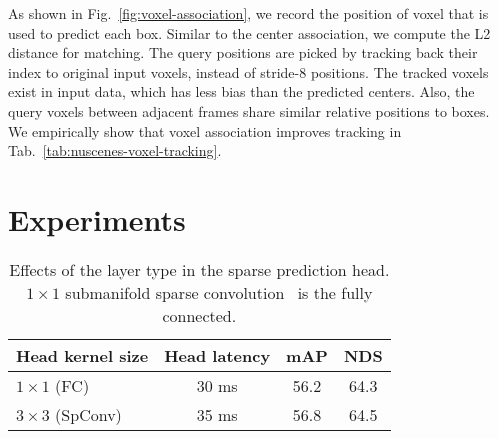 \documentclass[10pt,twocolumn,letterpaper]{article}
\begin{document}
As shown in Fig.~\ref{fig:voxel-association}, we record the position of voxel that is used to predict each box. Similar to the center association, we compute the L2 distance for matching. The query positions are picked by tracking back their index to original input voxels, instead of stride-8 positions.  The tracked voxels exist in input data, which has less bias than the predicted centers. Also, the query voxels between adjacent frames share similar relative positions to boxes. We empirically show that voxel association improves tracking in Tab.~\ref{tab:nuscenes-voxel-tracking}.

\section{Experiments}
\label{sec:experiments}

\begin{table}[t]
\begin{center}
\caption{Ablations on 2D or 3D sparse CNN in VoxelNeXt. sparse height Compression is used to connect 3D backbone and 2D head.}
\label{tab:ablation-sparse-bev-compression}
\end{center}
\end{table}
\begin{table}[t]
\begin{center}
\caption{Effects of the layer type in the sparse prediction head. $1\times 1$ submanifold sparse convolution~\cite{submanifold-sparse-conv-v2} is the fully connected.}
\begin{tabular}{|l|c|cc|}
\hline
{Head kernel size} &  Head latency   &   mAP    & NDS  \\ \hline
$1\times 1$ (FC) & 30 ms & 56.2 & 64.3 \\
$3\times 3$ (SpConv) & 35 ms & 56.8 & 64.5 \\
\hline
\end{tabular}
\label{tab:head-sparse-conv}
\end{center}
\end{table}
\end{document}
